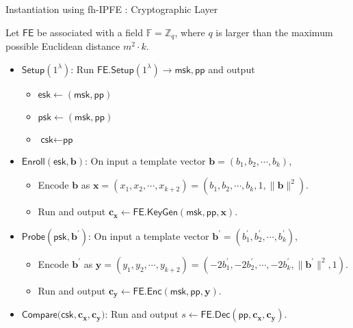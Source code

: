 \begin{frame}{Instantiation using fh-IPFE \cite{cryptoeprint:2023/481}: Cryptographic Layer}

Let $\textsf{FE}$ be associated with a field $\mathbb{F} = \mathbb{Z}_q$, where $q$ is larger than the maximum possible Euclidean distance $m^2 \cdot k$.
\medskip

\begin{itemize}

	\item<2-> $\textsf{Setup}(1^\lambda)$: Run $\textsf{FE.Setup}(1^\lambda) \to \textsf{msk}, \textsf{pp}$ and output 
	\begin{itemize}
		\item $\textsf{esk} \gets (\textsf{msk}, \textsf{pp})$
		\item $\textsf{psk} \gets (\textsf{msk}, \textsf{pp})$
		\item $\textsf{csk} \gets \textsf{pp}$
	\end{itemize}

	\item<3-> $\textsf{Enroll}(\textsf{esk}, \mathbf{b})$: On input a template vector $\mathbf{b} = (b_1, b_2, \cdots, b_k)$,
	\begin{itemize}
		\item Encode $\mathbf{b}$ as $\mathbf{x} = (x_1, x_2, \cdots, x_{k+2}) = (b_1, b_2, \cdots, b_k, 1, \|\mathbf{b}\|^2)$.
		\item Run and output $\mathbf{c_x} \gets \textsf{FE.KeyGen}(\textsf{msk}, \textsf{pp}, \mathbf{x})$.
	\end{itemize}

	\item<4-> $\textsf{Probe}(\textsf{psk}, \mathbf{b}^\prime)$: On input a template vector $\mathbf{b}^\prime = (b_1^\prime, b_2^\prime, \cdots, b_k^\prime)$,
	\begin{itemize}
		\item Encode $\mathbf{b}^\prime$ as $\mathbf{y} = (y_1, y_2, \cdots, y_{k+2}) = (-2b_1^\prime, -2b_2^\prime, \cdots, -2b_k^\prime, \|\mathbf{b}^\prime\|^2, 1)$.
		\item Run and output $\mathbf{c_y} \gets \textsf{FE.Enc}(\textsf{msk}, \textsf{pp}, \mathbf{y})$.
	\end{itemize}

	\item<5-> $\textsf{Compare}(\textsf{csk}, \mathbf{c_x}, \mathbf{c_y)}$: Run and output $s \gets \textsf{FE.Dec}(\textsf{pp}, \mathbf{c_x}, \mathbf{c_y})$.

\end{itemize}

\end{frame}


